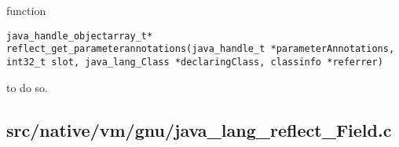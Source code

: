 \documentclass[a4paper, 10pt, titlepage]{scrartcl} %
\begin{document}
function \begin{scriptsize}\verb|java_handle_objectarray_t|\hspace{0.0pt}\verb|*|\hspace{0.0pt}\verb||\hspace{0.0pt}\verb| |\hspace{0.0pt}\verb|reflect_get_parameterannotations|\hspace{0.0pt}\verb|(|\hspace{0.0pt}\verb|java_handle_t|\hspace{0.0pt}\verb| |\hspace{0.0pt}\verb||\hspace{0.0pt}\verb|*|\hspace{0.0pt}\verb|parameterAnnotations|\hspace{0.0pt}\verb|,|\hspace{0.0pt}\verb||\hspace{0.0pt}\verb| |\hspace{0.0pt}\verb|int32_t|\hspace{0.0pt}\verb| |\hspace{0.0pt}\verb|slot|\hspace{0.0pt}\verb|,|\hspace{0.0pt}\verb||\hspace{0.0pt}\verb| |\hspace{0.0pt}\verb|java_lang_Class|\hspace{0.0pt}\verb| |\hspace{0.0pt}\verb||\hspace{0.0pt}\verb|*|\hspace{0.0pt}\verb|declaringClass|\hspace{0.0pt}\verb|,|\hspace{0.0pt}\verb||\hspace{0.0pt}\verb| |\hspace{0.0pt}\verb|classinfo|\hspace{0.0pt}\verb| |\hspace{0.0pt}\verb||\hspace{0.0pt}\verb|*|\hspace{0.0pt}\verb|referrer|\hspace{0.0pt}\verb|)|\hspace{0.0pt}\verb||\end{scriptsize} to do so.

\subsection{src/native/vm/gnu/java\_lang\_reflect\_Field.c}
\label{sec:src/native/vm/gnu/java_lang_reflect_Field.c}
\end{document}

